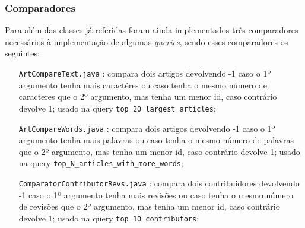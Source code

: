 \documentclass[a4paper,11pt]{article}
\begin{document}
\subsubsection{Comparadores}
Para além das classes já referidas foram ainda implementados três comparadores necessários à implementação de algumas \textit{queries}, sendo esses comparadores os seguintes:
\begin{itemize}[align=left]
\item[\texttt{ArtCompareText.java}]: compara dois artigos devolvendo -1 caso o 1º argumento tenha mais caractéres ou caso tenha o mesmo número de caracteres que o 2º argumento, mas tenha um menor id, caso contrário devolve 1; usado na query \texttt{top\_20\_largest\_articles};
\item[\texttt{ArtCompareWords.java}]: compara dois artigos devolvendo -1 caso o 1º argumento tenha mais palavras ou caso tenha o mesmo número de palavras que o 2º argumento, mas tenha um menor id, caso contrário devolve 1; usado na query \texttt{top\_N\_articles\_with\_more\_words};
\item[\texttt{ComparatorContributorRevs.java}]: compara dois contribuidores devolvendo -1 caso o 1º argumento tenha mais revisões ou caso tenha o mesmo número de revisões que o 2º argumento, mas tenha um menor id, caso contrário devolve 1; usado na query \texttt{top\_10\_contributors};
\end{itemize}
\end{document}
